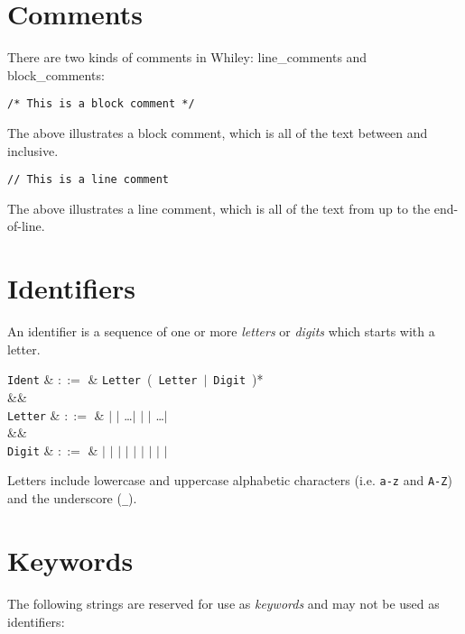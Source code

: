 \section{Comments}
There are two kinds of comments in Whiley: \gls{line_comment}s and \gls{block_comment}s:
\begin{lstlisting}
/* This is a block comment */
\end{lstlisting}
The above illustrates a block comment, which is all of the text between \token{/*} and \token{*/} inclusive.
\begin{lstlisting}
// This is a line comment
\end{lstlisting}
The above illustrates a line comment, which is all of the text from \token{//} up to the end-of-line.

\section{Identifiers}
An identifier is a sequence of one or more {\em letters} or {\em digits} which starts with a letter.
\begin{syntax}
\verb+Ident+ & $::=$ & \verb+Letter+\ \big(\ \verb+Letter+\ $|$\ \verb+Digit+\ \big)*\\
&&\\
\verb+Letter+ & $::=$ & \token{\_} $|$  $|$ \ldots $|$  $|$  $|$ \ldots $|$ \\
&&\\
\verb+Digit+ & $::=$ &  $|$  $|$  $|$  $|$  $|$  $|$  $|$  $|$  $|$ \\
\end{syntax}

Letters include lowercase and uppercase alphabetic characters (i.e. \lstinline+a-z+ and \lstinline+A-Z+) and the underscore (\lstinline+_+).

\section{Keywords}
The following strings are reserved for use as {\em keywords} and may not be used as identifiers:

